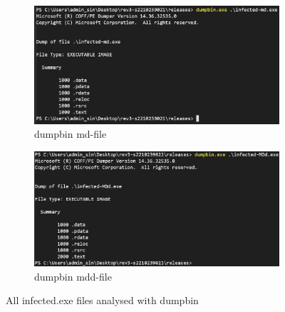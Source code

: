 \documentclass{article}
\begin{document}
\begin{figure}[htp]
		\begin{subfigure}[b]{0.45\textwidth}
			\includegraphics[width=\textwidth]{pictures/1. dumpbin md.png}
			\caption{dumpbin md-file}
			\label{fig:image3}
		\end{subfigure}
		\hfill
		\begin{subfigure}[b]{0.45\textwidth}
			\includegraphics[width=\textwidth]{pictures/1. dumpbin mdd.png}
			\caption{dumpbin mdd-file}
			\label{fig:image4}
		\end{subfigure}
		\caption{All infected.exe files analysed with dumpbin}
		\label{fig:grid}
	\end{figure}
	
	\pagebreak
	
\end{document}
